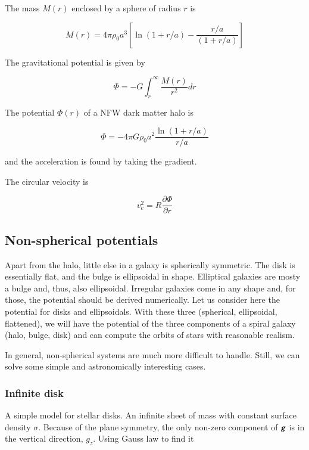 The mass $M(r)$ enclosed by a sphere of radius $r$ is

\begin{equation}
\boxed{
M(r) = 4\pi \rho_0 a^3  \left[ \ln\left(1+r/a\right)  -\frac{r/a}{(1+r/a)} \right]
}
\end{equation}


The gravitational potential is given by 

\begin{equation}
\varPhi = -G\int_r^{\infty} \frac{M(r)}{r^2} dr
\end{equation}


The potential $\varPhi(r)$ of a NFW dark matter halo is

\begin{equation}
\boxed{
\varPhi = -4\pi G \rho_0 a^2\frac{\ln(1+r/a)}{r/a}
}
\end{equation}

and the acceleration is found by taking the gradient. 


The circular velocity is 


\begin{equation}
v_c^2 = R\frac{\partial \varPhi}{\partial r}
\end{equation}


\subsection{Non-spherical potentials}

Apart from the halo, little else in a galaxy is spherically symmetric. The disk is essentially flat, and the bulge is ellipsoidal in shape. Elliptical galaxies are mosty a bulge and, thus, also ellipsoidal. Irregular galaxies come in any shape and, for those, the potential should be derived numerically. Let us consider here the potential for disks and ellipsoidals. With these three (spherical, ellipsoidal, flattened), we will have the potential of the three components of a spiral galaxy (halo, bulge, disk) and can compute the orbits of stars with reasonable realism.

In general, non-spherical systems are much more difficult to handle. Still, we can solve some simple and astronomically interesting cases. 

\subsubsection{Infinite disk}

A simple model for stellar disks. An infinite sheet of mass with constant surface density $\sigma$. Because of the plane symmetry, the only non-zero component of ${\boldsymbol{g}}$ is in the vertical direction, $g_z$. Using Gauss law to find it 

